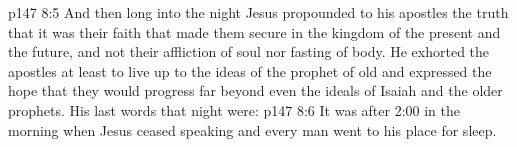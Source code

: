 \vs p147 8:5 \pc And then long into the night Jesus propounded to his apostles the truth that it was their faith that made them secure in the kingdom of the present and the future, and not their affliction of soul nor fasting of body. He exhorted the apostles at least to live up to the ideas of the prophet of old and expressed the hope that they would progress far beyond even the ideals of Isaiah and the older prophets. His last words that night were: 
\vs p147 8:6 It was after 2:00 in the morning when Jesus ceased speaking and every man went to his place for sleep.
\quizlink
